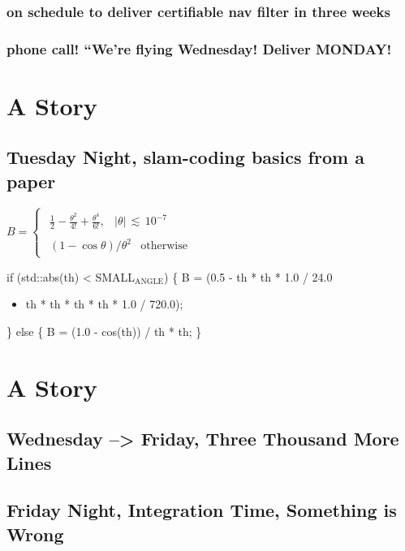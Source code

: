 \documentclass[10pt,oneside,x11names]{article}
\begin{document}
\subsubsection{on schedule to deliver certifiable nav filter in three weeks}
\label{sec:orgdcda1c9}
\subsubsection{phone call! ``We're flying Wednesday! Deliver MONDAY!}
\label{sec:orgff1ad55}
\section{A Story}
\label{sec:org05b5015}
\subsection{Tuesday Night, slam-coding basics from a paper}
\label{sec:org22d2b83}
\(B=\begin{cases} \begin{matrix} \frac { 1 }{ 2 } -\frac { \theta ^{ 2 } }{ 4! }
+\frac { \theta ^{ 4 } }{ 6! } , & | \theta | \, \lesssim \, 10^{ -7 } \end{matrix}
\\ \begin{matrix} { \left( 1-\cos { \theta  }  \right)  }/{ { \theta  }^{ 2 } }
& \mathrm{otherwise} \quad  \end{matrix} \end{cases}\)

if (std::abs(th) < SMALL\(_{\text{ANGLE}}\)) \{
    B = (0.5 - th * th * 1.0 / 24.0
\begin{itemize}
\item th * th * th * th * 1.0 / 720.0);
\end{itemize}
\} else \{ B = (1.0 - cos(th)) / th * th; \}

\section{A Story}
\label{sec:orge656132}
\subsection{Wednesday --> Friday, Three Thousand More Lines}
\label{sec:orgfbf8ea6}
\subsection{Friday Night, Integration Time, Something is Wrong}
\label{sec:orgeb63967}
\end{document}
